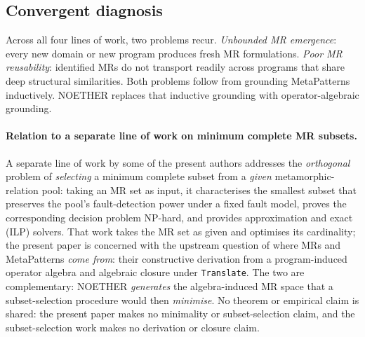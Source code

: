 \documentclass[manuscript]{acmart}
\begin{document}
\subsection{Convergent diagnosis}

Across all four lines of work, two problems recur. \emph{Unbounded MR emergence}: every new domain or new program produces fresh MR formulations. \emph{Poor MR reusability}: identified MRs do not transport readily across programs that share deep structural similarities. Both problems follow from grounding MetaPatterns inductively. NOETHER replaces that inductive grounding with operator-algebraic grounding.
\paragraph{Relation to a separate line of work on minimum complete MR subsets.}
A separate line of work by some of the present authors addresses the
\emph{orthogonal} problem of \emph{selecting} a minimum complete subset from a
\emph{given} metamorphic-relation pool: taking an MR set as input, it
characterises the smallest subset that preserves the pool's fault-detection
power under a fixed fault model, proves the corresponding decision problem
NP-hard, and provides approximation and exact (ILP) solvers. That work takes
the MR set as given and optimises its cardinality; the present paper is
concerned with the upstream question of where MRs and MetaPatterns
\emph{come from}: their constructive derivation from a program-induced
operator algebra and algebraic closure under \texttt{Translate}. The two are
complementary: NOETHER \emph{generates} the algebra-induced MR space that a
subset-selection procedure would then \emph{minimise}. No theorem or empirical
claim is shared: the present paper makes no minimality or subset-selection
claim, and the subset-selection work makes no derivation or closure claim.
\end{document}
